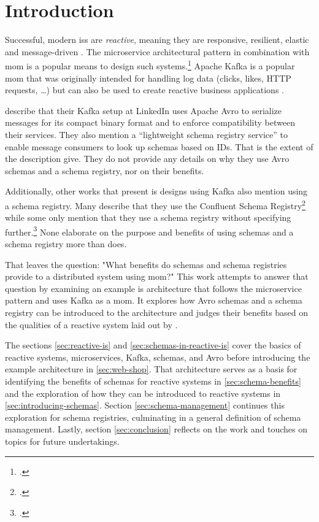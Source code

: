 
\section{Introduction}\label{sec:introduction}

Successful, modern \glspl{is} are \emph{reactive}, meaning they are responsive, resilient, elastic and message-driven \parencite{boner_reactive_2014}.
The microservice architectural pattern in combination with \gls{mom} is a popular means to design such systems.\footcites()(85){loukides_microservice_adoption_2020}{fowler_microservices_2014}{boner_reactive_2014}{richardson_microservices_2019}
Apache Kafka is a popular \gls{mom} that was originally intended for handling log data (clicks, likes, HTTP requests, \ldots) \parencite{kreps_kafka_2011} but can also be used to create reactive business applications \parencite{stopford_designing_2018}.

\citeauthor[]{kreps_kafka_2011} describe that their Kafka setup at LinkedIn uses Apache Avro to serialize messages for its compact binary format and to enforce compatibility between their services.
They also mention a \enquote{lightweight schema registry service} to enable message consumers to look up schemas based on IDs.
That is the extent of the description \citeauthor[]{kreps_kafka_2011} give.
They do not provide any details on why they use Avro schemas and a schema registry, nor on their benefits.
\parencite{kreps_kafka_2011}

Additionally, other works that present \gls{is} designs using Kafka also mention using a schema registry.
Many describe that they use the Confluent Schema Registry\footcites{radchenko_micro-workflows_2018}{ranjan_radar-base_2019}{korhonen_using_2019}{auer_distributed_2017}{dessalegn_muruts_multi-tenant_2016}
while some only mention that they use a schema registry without specifying further.\footcites{g_b_high_2021}{muller_iot_2017}
None elaborate on the purpose and benefits of using schemas and a schema registry more than \cite{kreps_kafka_2011} does.

That leaves the question: "What benefits do schemas and schema registries provide to a distributed system using \gls{mom}?"
This work attempts to answer that question by examining an example \gls{is} architecture that follows the microservice pattern and uses Kafka as a \gls{mom}.
It explores how Avro schemas and a schema registry can be introduced to the architecture and judges their benefits based on the qualities of a reactive system laid out by \cite{boner_reactive_2014}.

The sections \ref{sec:reactive-is} and \ref{sec:schemas-in-reactive-is} cover the basics of reactive systems, microservices, Kafka, schemas, and Avro before introducing the example architecture in \ref{sec:web-shop}.
That architecture serves as a basis for identifying the benefits of schemas for reactive systems in \ref{sec:schema-benefits} and the exploration of how they can be introduced to reactive systems in \ref{sec:introducing-schemas}.
Section \ref{sec:schema-management} continues this exploration for schema registries, culminating in a general definition of schema management.
Lastly, section \ref{sec:conclusion} reflects on the work and touches on topics for future undertakings.